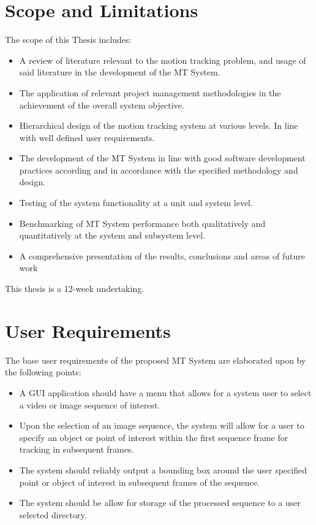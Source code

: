 \section{Scope and Limitations}\label{introduction_scope}
The scope of this Thesis includes: 
\begin{itemize}
    \item A review of literature relevant to the motion tracking problem, and usage of
        said literature in the development of the MT System.
    \item The application of relevant project management methodologies in the
        achievement of the overall system objective.
    \item Hierarchical design of the motion tracking system at various levels.
        In line with well defined user requirements.
    \item The development of the MT System in line with good software development
        practices according and in accordance with the specified methodology and design.
    \item Testing of the system functionality at a unit and system level.
    \item Benchmarking of MT System performance both qualitatively and
        quantitatively at the system and subsystem level.
    \item A comprehensive presentation of the results, conclusions and areas of
        future work 
\end{itemize}
This thesis is a 12-week undertaking.

\section{User Requirements}\label{introduction_user_requirements}
The base user requirements of the proposed MT System are elaborated upon by the
following points:
\begin{itemize}
    \item A GUI application should have a menu that allows for a system
        user to select a video or image sequence of interest.
    \item Upon the selection of an image sequence, the system will allow for a
        user to specify an object or point of interest within the first sequence
        frame for tracking in subsequent frames.
    \item The system should reliably output a bounding box around the user
        specified point or object of interest in subsequent frames of the
        sequence. 
    \item The system should be allow for storage of the processed sequence to
        a user selected directory.
\end{itemize}

